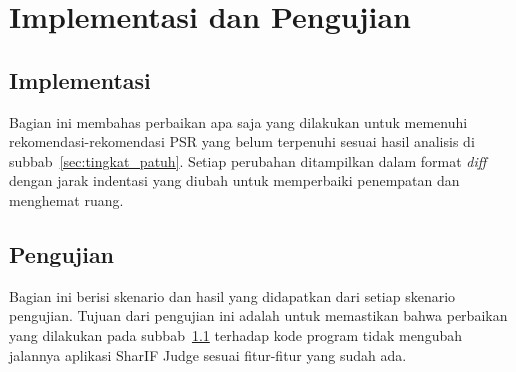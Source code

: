 \chapter{Implementasi dan Pengujian}
\label{chap:implementasi}

\section{Implementasi}
\label{sec:implementasi}
Bagian ini membahas perbaikan apa saja yang dilakukan untuk memenuhi rekomendasi-rekomendasi PSR yang belum terpenuhi sesuai hasil analisis di subbab~\ref{sec:tingkat_patuh}. Setiap perubahan ditampilkan dalam format \textit{diff} dengan jarak indentasi yang diubah untuk memperbaiki penempatan dan menghemat ruang.

\section{Pengujian}
\label{sec:pengujian}
Bagian ini berisi skenario dan hasil yang didapatkan dari setiap skenario pengujian. Tujuan dari pengujian ini adalah untuk memastikan bahwa perbaikan yang dilakukan pada subbab~\ref{sec:implementasi} terhadap kode program tidak mengubah jalannya aplikasi SharIF Judge sesuai fitur-fitur yang sudah ada. 